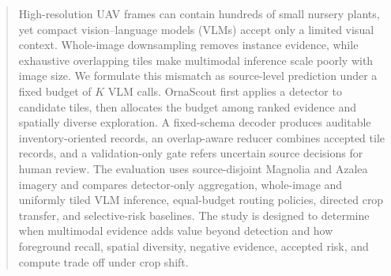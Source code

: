 \begin{abstract}
High-resolution UAV frames can contain hundreds of small nursery plants, yet compact vision--language models (VLMs) accept only a limited visual context. Whole-image downsampling removes instance evidence, while exhaustive overlapping tiles make multimodal inference scale poorly with image size. We formulate this mismatch as source-level prediction under a fixed budget of $K$ VLM calls. OrnaScout first applies a detector to candidate tiles, then allocates the budget among ranked evidence and spatially diverse exploration. A fixed-schema decoder produces auditable inventory-oriented records, an overlap-aware reducer combines accepted tile records, and a validation-only gate refers uncertain source decisions for human review. The evaluation uses source-disjoint Magnolia and Azalea imagery and compares detector-only aggregation, whole-image and uniformly tiled VLM inference, equal-budget routing policies, directed crop transfer, and selective-risk baselines.  The study is designed to determine when multimodal evidence adds value beyond detection and how foreground recall, spatial diversity, negative evidence, accepted risk, and compute trade off under crop shift.
\end{abstract}
